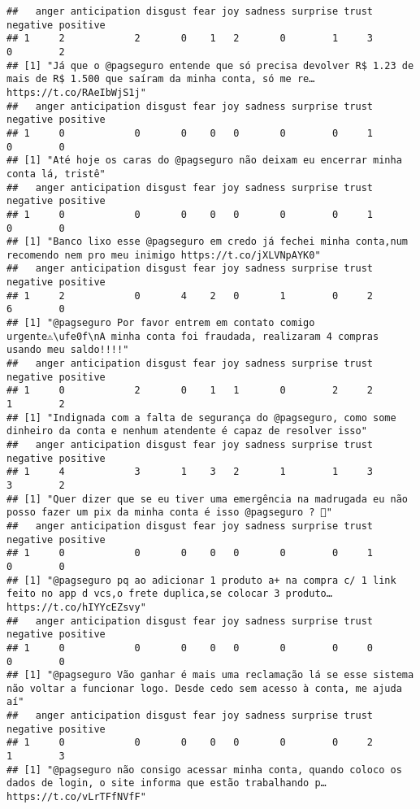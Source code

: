 \documentclass[
]{article}
\begin{document}
\begin{verbatim}
##   anger anticipation disgust fear joy sadness surprise trust negative positive
## 1     2            2       0    1   2       0        1     3        0        2
## [1] "Já que o @pagseguro entende que só precisa devolver R$ 1.23 de mais de R$ 1.500 que saíram da minha conta, só me re… https://t.co/RAeIbWjS1j"
##   anger anticipation disgust fear joy sadness surprise trust negative positive
## 1     0            0       0    0   0       0        0     1        0        0
## [1] "Até hoje os caras do @pagseguro não deixam eu encerrar minha conta lá, tristê"
##   anger anticipation disgust fear joy sadness surprise trust negative positive
## 1     0            0       0    0   0       0        0     1        0        0
## [1] "Banco lixo esse @pagseguro em credo já fechei minha conta,num recomendo nem pro meu inimigo https://t.co/jXLVNpAYK0"
##   anger anticipation disgust fear joy sadness surprise trust negative positive
## 1     2            0       4    2   0       1        0     2        6        0
## [1] "@pagseguro Por favor entrem em contato comigo urgente⚠\ufe0f\nA minha conta foi fraudada, realizaram 4 compras usando meu saldo!!!!"
##   anger anticipation disgust fear joy sadness surprise trust negative positive
## 1     0            2       0    1   1       0        2     2        1        2
## [1] "Indignada com a falta de segurança do @pagseguro, como some dinheiro da conta e nenhum atendente é capaz de resolver isso"
##   anger anticipation disgust fear joy sadness surprise trust negative positive
## 1     4            3       1    3   2       1        1     3        3        2
## [1] "Quer dizer que se eu tiver uma emergência na madrugada eu não posso fazer um pix da minha conta é isso @pagseguro ? 🤔"
##   anger anticipation disgust fear joy sadness surprise trust negative positive
## 1     0            0       0    0   0       0        0     1        0        0
## [1] "@pagseguro pq ao adicionar 1 produto a+ na compra c/ 1 link feito no app d vcs,o frete duplica,se colocar 3 produto… https://t.co/hIYYcEZsvy"
##   anger anticipation disgust fear joy sadness surprise trust negative positive
## 1     0            0       0    0   0       0        0     0        0        0
## [1] "@pagseguro Vão ganhar é mais uma reclamação lá se esse sistema não voltar a funcionar logo. Desde cedo sem acesso à conta, me ajuda aí"
##   anger anticipation disgust fear joy sadness surprise trust negative positive
## 1     0            0       0    0   0       0        0     2        1        3
## [1] "@pagseguro não consigo acessar minha conta, quando coloco os dados de login, o site informa que estão trabalhando p… https://t.co/vLrTFfNVfF"

\end{verbatim}
\end{document}
